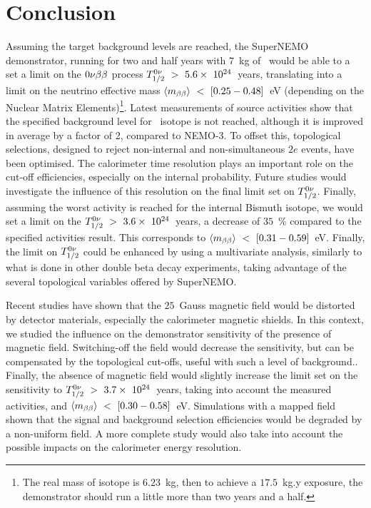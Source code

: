 



\section{Conclusion}

Assuming the target background levels are reached, the SuperNEMO demonstrator, running for two and half years with $7$~kg of \Se\ would be able to a set a limit on the $0\nu\beta\beta$ process $T_{1/2}^{0\nu}~>~5.6\times~10^{24}$~years, translating into a limit on the neutrino effective mass $\langle m_{\beta\beta}\rangle~<~[0.25-0.48]$~eV (depending on the Nuclear Matrix Elements)\footnote{The real mass of isotope is $6.23$~kg, then to achieve a $17.5$~kg.y exposure, the demonstrator should run a little more than two years and a half.}.
Latest measurements of source activities show that the specified background level for \Tl\ isotope is not reached, although it is improved in average by a factor of 2, compared to NEMO-$3$.
To offset this, topological selections, designed to reject non-internal and non-simultaneous $2e$ events, have been optimised.
The calorimeter time resolution plays an important role on the cut-off efficiencies, especially on the internal probability.
Future studies would investigate the influence of this resolution on the final limit set on $T_{1/2}^{0\nu}$.
Finally, assuming the worst activity is reached for the internal Bismuth isotope, we would set a limit on the $T_{1/2}^{0\nu}~>~3.6\times~10^{24}$~years, a decrease of $35$~\% compared to the specified activities result.
This corresponds to $\langle m_{\beta\beta}\rangle~<~[0.31-0.59]$~eV.
Finally, the limit on $T_{1/2}^{0\nu}$ could be enhanced by using a multivariate analysis, similarly to what is done in other double beta decay experiments, taking advantage of the several topological variables offered by SuperNEMO.

Recent studies have shown that the $25$~Gauss magnetic field would be distorted by detector materials, especially the calorimeter magnetic shields.
In this context, we studied the influence on the demonstrator sensitivity of the presence of magnetic field.
Switching-off the field would decrease the sensitivity, but can be compensated by the topological cut-offs, useful with such a level of background..
Finally, the absence of magnetic field would slightly increase the limit set on the sensitivity to $T_{1/2}^{0\nu}~>~3.7\times~10^{24}$~years, taking into account the measured activities, and $\langle m_{\beta\beta}\rangle~<~[0.30-0.58]$~eV.
Simulations with a mapped field shown that the signal and background selection efficiencies would be degraded by a non-uniform field.
A more complete study would also take into account the possible impacts on the calorimeter energy resolution.

